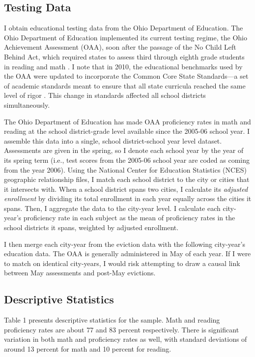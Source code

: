 \documentclass[12pt]{article}
\begin{document}
\subsection{Testing Data}
I obtain educational testing data from the Ohio Department of Education. The Ohio Department of Education implemented its current testing regime, the Ohio Achievement Assessment (OAA), soon after the passage of the No Child Left Behind Act, which required states to assess third through eighth grade students in reading and math \citep{fox_examination_2014}. I note that in  2010, the educational benchmarks used by the OAA were updated to incorporate the Common Core State Standards—a set of academic standards meant to ensure that all state curricula reached the same level of rigor \citep{ohio_school_boards_association_ohios_2010}. This change in standards affected all school districts simultaneously.

The Ohio Department of Education has made OAA proficiency rates in math and reading at the school district-grade level available since the 2005-06 school year. I assemble this data into a single, school district-school year level dataset. Assessments are given in the spring, so I denote each school year by the year of its spring term (i.e., test scores from the 2005-06 school year are coded as coming from the year 2006). Using the National Center for Education Statistics (NCES) geographic relationship files, I match each school district to the city or cities that it intersects with. When a school district spans two cities, I calculate its \textit{adjusted enrollment} by dividing its total enrollment in each year equally across the cities it spans. Then, I aggregate the data to the city-year level. I calculate each city-year's proficiency rate in each subject as the mean of proficiency rates in the school districts it spans, weighted by adjusted enrollment.

I then merge each city-year from the eviction data with the following city-year's education data. The OAA is generally administered in May of each year. If I were to match on identical city-years, I would risk attempting to draw a causal link between May assessments and post-May evictions.


\subsection{Descriptive Statistics}
Table 1 presents descriptive statistics for the sample. Math and reading proficiency rates are about 77 and 83 percent respectively. There is significant variation in both math and proficiency rates as well, with standard deviations of around 13 percent for math and 10 percent for reading.
\end{document}

